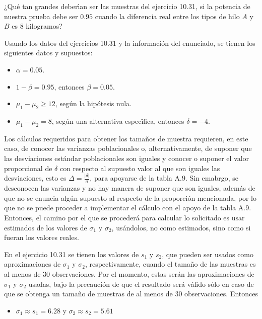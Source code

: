 \begin{enunciado}
 ¿Qu\'e tan grandes deber\'{\i}an ser las muestras del ejercicio 10.31, si la potencia de nuestra prueba debe ser $0.95$ cuando la diferencia real entre los tipos de hilo $A$ y $B$ es $8$ kilogramos?
\end{enunciado}

\begin{solucion}
 Usando los datos del ejercicios 10.31
 y la informaci\'on del enunciado,
 se tienen los siguientes datos y supuestos:
 \begin{itemize}
  \item $\alpha = 0.05$.
  \item $1-\beta = 0.95$, entonces $\beta = 0.05$.
  \item $\mu_1 - \mu_2 \geq 12$, seg\'un la hip\'otesis nula.
  \item $\mu_1 - \mu_2 = 8$, seg\'un una alternativa espec\'{\'i}fica,
  entonces $\delta = -4$.
 \end{itemize}
 Los c\'alculos requeridos para obtener los tama\~nos de muestra requieren,
 en este caso, de conocer las varianzas poblacionales o, alternativamente,
 de suponer que las desviaciones est\'andar poblacionales son iguales
 y conocer o suponer el valor proporcional de $\delta$
 con respecto al supuesto valor al que son iguales las desviaciones,
 esto es $\Delta = \frac{|\delta|}{\sigma}$, para apoyarse de la tabla A.9.
 Sin emabrgo, se desconocen las varianzas y no hay manera de suponer que son iguales,
 adem\'as de que no se enuncia alg\'un supuesto al respecto de la proporci\'on
 mencionada, por lo que no se puede proceder a implementar el c\'alculo con el apoyo de la tabla A.9.
 Entonces, el camino por el que se proceder\'a para calcular lo solicitado
 es usar estimados de los valores de $\sigma_1$ y $\sigma_2$,
 us\'andolos, no como estimados, sino como si fueran los valores reales.
 \par
 En el ejercicio 10.31 se tienen los valores de $s_1$ y $s_2$, que pueden ser usados
 como aproximaciones de $\sigma_1$ y $\sigma_2$, respectivamente,
 cuando el tama\~no de las muestras es al menos de $30$ observaciones.
 Por el momento, estas ser\'an las aproximaciones de $\sigma_1$ y $\sigma_2$ usadas,
 bajo la precauci\'on de que el resultado ser\'a v\'alido
 s\'olo en caso de que se obtenga un tama\~no de muestras de al menos de 30
 observaciones. Entonces
 \begin{itemize}
  \item $\sigma_1 \approx s_1 = 6.28$ y $\sigma_2 \approx s_2 = 5.61$

\end{itemize}
\end{solucion}
